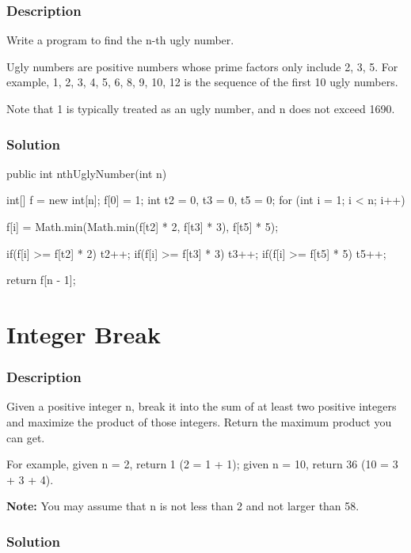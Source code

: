 \subsubsection{Description}
Write a program to find the n-th ugly number.

Ugly numbers are positive numbers whose prime factors only include 2, 3, 5. For example, 1, 2, 3, 4, 5, 6, 8, 9, 10, 12 is the sequence of the first 10 ugly numbers.

Note that 1 is typically treated as an ugly number, and n does not exceed 1690.

\subsubsection{Solution}

\begin{Code}
public int nthUglyNumber(int n) {
    int[] f = new int[n];
    f[0] = 1;
    int t2 = 0, t3 = 0, t5 = 0;
    for (int i = 1; i < n; i++) {
        f[i] = Math.min(Math.min(f[t2] * 2, f[t3] * 3), f[t5] * 5);

        if(f[i] >= f[t2] * 2) {
            t2++;
        }
        if(f[i] >= f[t3] * 3) {
            t3++;
        }
        if(f[i] >= f[t5] * 5) {
            t5++;
        }
    }
    return f[n - 1];
}
\end{Code}

\newpage

\section{Integer Break} %

\subsubsection{Description}
Given a positive integer n, break it into the sum of at least two positive integers and maximize the product of those integers. Return the maximum product you can get.

For example, given n = 2, return 1 (2 = 1 + 1); given n = 10, return 36 (10 = 3 + 3 + 4).

\textbf{Note:} You may assume that n is not less than 2 and not larger than 58.

\subsubsection{Solution}

